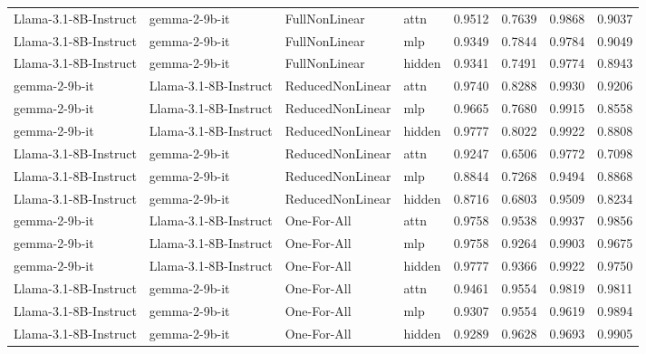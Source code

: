 {\begin{tabularx}{\textwidth}{XXXlcccc}
Llama-3.1-8B-Instruct & gemma-2-9b-it & FullNonLinear & attn & 0.9512 & 0.7639 & 0.9868 & 0.9037 \\
Llama-3.1-8B-Instruct & gemma-2-9b-it & FullNonLinear & mlp & 0.9349 & 0.7844 & 0.9784 & 0.9049 \\
Llama-3.1-8B-Instruct & gemma-2-9b-it & FullNonLinear & hidden & 0.9341 & 0.7491 & 0.9774 & 0.8943 \\
\midrule
gemma-2-9b-it & Llama-3.1-8B-Instruct & ReducedNonLinear & attn & 0.9740 & 0.8288 & 0.9930 & 0.9206 \\
gemma-2-9b-it & Llama-3.1-8B-Instruct & ReducedNonLinear & mlp & 0.9665 & 0.7680 & 0.9915 & 0.8558 \\
gemma-2-9b-it & Llama-3.1-8B-Instruct & ReducedNonLinear & hidden & 0.9777 & 0.8022 & 0.9922 & 0.8808 \\
Llama-3.1-8B-Instruct & gemma-2-9b-it & ReducedNonLinear & attn & 0.9247 & 0.6506 & 0.9772 & 0.7098 \\
Llama-3.1-8B-Instruct & gemma-2-9b-it & ReducedNonLinear & mlp & 0.8844 & 0.7268 & 0.9494 & 0.8868 \\
Llama-3.1-8B-Instruct & gemma-2-9b-it & ReducedNonLinear & hidden & 0.8716 & 0.6803 & 0.9509 & 0.8234 \\
\midrule
gemma-2-9b-it & Llama-3.1-8B-Instruct & One-For-All & attn & 0.9758 & 0.9538 & 0.9937 & 0.9856 \\
gemma-2-9b-it & Llama-3.1-8B-Instruct & One-For-All & mlp & 0.9758 & 0.9264 & 0.9903 & 0.9675 \\
gemma-2-9b-it & Llama-3.1-8B-Instruct & One-For-All & hidden & 0.9777 & 0.9366 & 0.9922 & 0.9750 \\
Llama-3.1-8B-Instruct & gemma-2-9b-it & One-For-All & attn & 0.9461 & 0.9554 & 0.9819 & 0.9811 \\
Llama-3.1-8B-Instruct & gemma-2-9b-it & One-For-All & mlp & 0.9307 & 0.9554 & 0.9619 & 0.9894 \\
Llama-3.1-8B-Instruct & gemma-2-9b-it & One-For-All & hidden & 0.9289 & 0.9628 & 0.9693 & 0.9905 \\
\end{tabularx}
}

